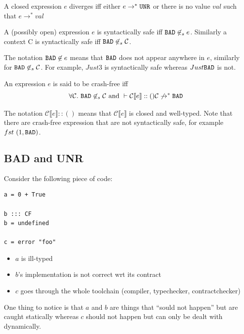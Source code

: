 \documentclass[preprint]{sigplanconf}
\begin{document}
\begin{definition}[Diverges]
A closed expression $e$ diverges iff either $e \to^* \texttt{UNR}$ or there is
no value $val$ such that $e \to^* val$
\end{definition}

\begin{definition}
A (possibly open) expression $e$ is syntactically safe iff $\texttt{BAD} \not
\in_s e$. Similarly a context \cal C is syntactically safe iff $\texttt{BAD}
\not \in_s \mathcal{C}$.
\end{definition}

The notation $\texttt{BAD} \not \in e$ means that $\texttt{BAD}$ does not appear
anywhere in $e$, similarly for $\texttt{BAD} \not \in_s \mathcal{C}$. For
example, $Just 3$ is syntactically safe whereas $Just \texttt{BAD}$ is not.

\begin{definition}
An expression $e$ is said to be crash-free iff 
$$\forall \mathcal{C}.~\texttt{BAD} \not \in_s \mathcal{C} \mbox{ and } \vdash
\mathcal{C} \llbracket e \rrbracket :: () \mathcal{C} \not \to^* \texttt{BAD}$$
\end{definition}
The notation $\mathcal{C} \llbracket e \rrbracket :: ()$ means that
$\mathcal{C} \llbracket e \rrbracket$ is closed and well-typed.  Note
that there are crash-free expression that are not syntactically safe,
for example $fst~(1,\texttt{BAD})$.

\subsection{BAD and UNR}
Consider the following piece of code:
\begin{verbatim}
a = 0 + True

b ::: CF
b = undefined

c = error "foo"
\end{verbatim}


\begin{itemize}
\item $a$ is ill-typed
\item $b$'s implementation is not correct wrt its contract
\item $c$ goes through the whole toolchain (compiler, typechecker, contractchecker)
\end{itemize}

One thing to notice is that $a$ and $b$ are things that ``sould not
happen'' but are caught statically whereas $c$ should not happen but
can only be dealt with dynamically.
\end{document}
